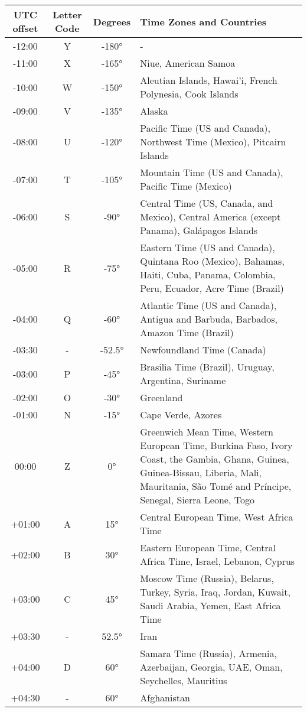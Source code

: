 \begin{footnotesize}
\begin{tabular}{c | c | c | p{}}
	UTC offset & Letter Code & Degrees & Time Zones and Countries\\\hline
	-12:00&Y&-180°& - \\\hline
	-11:00&X&-165°&Niue, American Samoa\\\hline
	-10:00&W&-150°&Aleutian Islands, Hawai'i, French Polynesia, Cook Islands\\\hline
	-09:00&V&-135°&Alaska\\\hline
	-08:00&U&-120°&Pacific Time (US and Canada), Northwest Time (Mexico), Pitcairn Islands\\\hline
	-07:00&T&-105°&Mountain Time (US and Canada), Pacific Time (Mexico)\\\hline
	-06:00&S&-90°&Central Time (US, Canada, and Mexico), Central America (except Panama), Galápagos Islands\\\hline
	-05:00&R&-75°&Eastern Time (US and Canada), Quintana Roo (Mexico), Bahamas, Haiti, Cuba, Panama, Colombia, Peru, Ecuador, Acre Time (Brazil) \\\hline
	-04:00&Q&-60°&Atlantic Time (US and Canada), Antigua and Barbuda, Barbados, Amazon Time (Brazil)\\\hline
	-03:30& - &-52.5°&Newfoundland Time (Canada)\\\hline
	-03:00&P&-45°&Brasilia Time (Brazil), Uruguay, Argentina, Suriname\\\hline
	-02:00&O&-30°&Greenland\\\hline
	-01:00&N&-15°&Cape Verde, Azores\\\hline
	00:00&Z&0°&Greenwich Mean Time, Western European Time, Burkina Faso, Ivory Coast, the Gambia, Ghana, Guinea, Guinea-Bissau, Liberia, Mali, Mauritania, São Tomé and Príncipe, Senegal, Sierra Leone, Togo\\\hline
	+01:00&A&15°&Central European Time, West Africa Time\\\hline
	+02:00&B&30°&Eastern European Time, Central Africa Time, Israel, Lebanon, Cyprus\\\hline
	+03:00&C&45°&Moscow Time (Russia), Belarus, Turkey, Syria, Iraq, Jordan, Kuwait, Saudi Arabia, Yemen, East Africa Time\\\hline
	+03:30& - &52.5°&Iran\\\hline
	+04:00&D&60°&Samara Time (Russia), Armenia, Azerbaijan, Georgia, UAE, Oman, Seychelles, Mauritius\\\hline
	+04:30& - &60°&Afghanistan\\\hline

\end{tabular}
\end{footnotesize}
